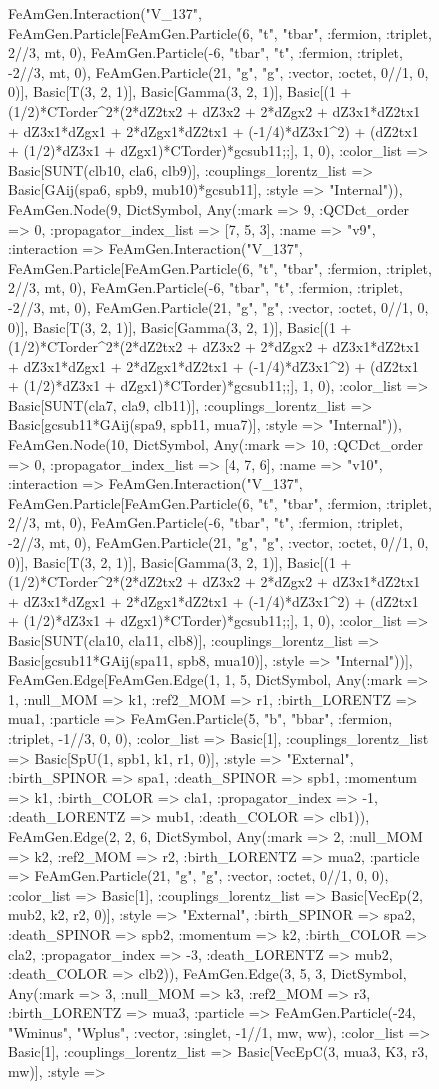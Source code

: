 \documentclass{revtex4}
\begin{document}
\begin{figure}[!htb]
\begin{center}
{FeAmGen.Interaction("V_137", FeAmGen.Particle[FeAmGen.Particle(6, "t", "tbar", :fermion, :triplet, 2//3, mt, 0), FeAmGen.Particle(-6, "tbar", "t", :fermion, :triplet, -2//3, mt, 0), FeAmGen.Particle(21, "g", "g", :vector, :octet, 0//1, 0, 0)], Basic[T(3, 2, 1)], Basic[Gamma(3, 2, 1)], Basic[(1 + (1/2)*CTorder^2*(2*dZ2tx2 + dZ3x2 + 2*dZgx2 + dZ3x1*dZ2tx1 + dZ3x1*dZgx1 + 2*dZgx1*dZ2tx1 + (-1/4)*dZ3x1^2) + (dZ2tx1 + (1/2)*dZ3x1 + dZgx1)*CTorder)*gcsub11;;], 1, 0), :color_list => Basic[SUNT(clb10, cla6, clb9)], :couplings_lorentz_list => Basic[GAij(spa6, spb9, mub10)*gcsub11], :style => "Internal")), FeAmGen.Node(9, Dict{Symbol, Any}(:mark => 9, :QCDct_order => 0, :propagator_index_list => [7, 5, 3], :name => "v9", :interaction => FeAmGen.Interaction("V_137", FeAmGen.Particle[FeAmGen.Particle(6, "t", "tbar", :fermion, :triplet, 2//3, mt, 0), FeAmGen.Particle(-6, "tbar", "t", :fermion, :triplet, -2//3, mt, 0), FeAmGen.Particle(21, "g", "g", :vector, :octet, 0//1, 0, 0)], Basic[T(3, 2, 1)], Basic[Gamma(3, 2, 1)], Basic[(1 + (1/2)*CTorder^2*(2*dZ2tx2 + dZ3x2 + 2*dZgx2 + dZ3x1*dZ2tx1 + dZ3x1*dZgx1 + 2*dZgx1*dZ2tx1 + (-1/4)*dZ3x1^2) + (dZ2tx1 + (1/2)*dZ3x1 + dZgx1)*CTorder)*gcsub11;;], 1, 0), :color_list => Basic[SUNT(cla7, cla9, clb11)], :couplings_lorentz_list => Basic[gcsub11*GAij(spa9, spb11, mua7)], :style => "Internal")), FeAmGen.Node(10, Dict{Symbol, Any}(:mark => 10, :QCDct_order => 0, :propagator_index_list => [4, 7, 6], :name => "v10", :interaction => FeAmGen.Interaction("V_137", FeAmGen.Particle[FeAmGen.Particle(6, "t", "tbar", :fermion, :triplet, 2//3, mt, 0), FeAmGen.Particle(-6, "tbar", "t", :fermion, :triplet, -2//3, mt, 0), FeAmGen.Particle(21, "g", "g", :vector, :octet, 0//1, 0, 0)], Basic[T(3, 2, 1)], Basic[Gamma(3, 2, 1)], Basic[(1 + (1/2)*CTorder^2*(2*dZ2tx2 + dZ3x2 + 2*dZgx2 + dZ3x1*dZ2tx1 + dZ3x1*dZgx1 + 2*dZgx1*dZ2tx1 + (-1/4)*dZ3x1^2) + (dZ2tx1 + (1/2)*dZ3x1 + dZgx1)*CTorder)*gcsub11;;], 1, 0), :color_list => Basic[SUNT(cla10, cla11, clb8)], :couplings_lorentz_list => Basic[gcsub11*GAij(spa11, spb8, mua10)], :style => "Internal"))], FeAmGen.Edge[FeAmGen.Edge(1, 1, 5, Dict{Symbol, Any}(:mark => 1, :null_MOM => k1, :ref2_MOM => r1, :birth_LORENTZ => mua1, :particle => FeAmGen.Particle(5, "b", "bbar", :fermion, :triplet, -1//3, 0, 0), :color_list => Basic[1], :couplings_lorentz_list => Basic[SpU(1, spb1, k1, r1, 0)], :style => "External", :birth_SPINOR => spa1, :death_SPINOR => spb1, :momentum => k1, :birth_COLOR => cla1, :propagator_index => -1, :death_LORENTZ => mub1, :death_COLOR => clb1)), FeAmGen.Edge(2, 2, 6, Dict{Symbol, Any}(:mark => 2, :null_MOM => k2, :ref2_MOM => r2, :birth_LORENTZ => mua2, :particle => FeAmGen.Particle(21, "g", "g", :vector, :octet, 0//1, 0, 0), :color_list => Basic[1], :couplings_lorentz_list => Basic[VecEp(2, mub2, k2, r2, 0)], :style => "External", :birth_SPINOR => spa2, :death_SPINOR => spb2, :momentum => k2, :birth_COLOR => cla2, :propagator_index => -3, :death_LORENTZ => mub2, :death_COLOR => clb2)), FeAmGen.Edge(3, 5, 3, Dict{Symbol, Any}(:mark => 3, :null_MOM => k3, :ref2_MOM => r3, :birth_LORENTZ => mua3, :particle => FeAmGen.Particle(-24, "Wminus", "Wplus", :vector, :singlet, -1//1, mw, ww), :color_list => Basic[1], :couplings_lorentz_list => Basic[VecEpC(3, mua3, K3, r3, mw)], :style => }
\end{center}
\end{figure}
\end{document}
